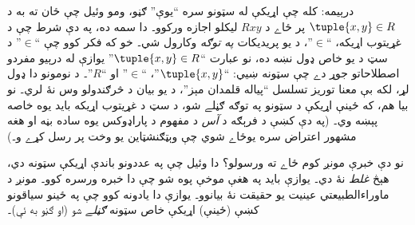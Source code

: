 \documentclass[../../../include/open-logic-section]{subfiles}
\begin{document}
درېيمه: کله چې اړيکې له سټونو سره ``يوې'' ګڼو، ومو وئيل چې ځان ته
به د $\tuple{x,y} \in R$ پر ځاے د $Rxy$ ليکلو اجازه ورکوو۔ دا سمه
ده، په دې شرط چې د غړيتوب اړيکه، ``$\in$''، د يو پريديکات
\emph{په توګه} وکارول شي۔ خو که فکر کوو چې ``$\in$'' د سټ د يو
خاص ډول نښه ده، نو عبارت ``$\tuple{x,y} \in R$'' يوازې له درېيو
مفردو اصطلاحاتو جوړ دے چې سټونه ښيي: ``$\tuple{x,y}$''، ``$\in$''
او ``$R$''۔ د نومونو دا ډول لړ، لکه بې معنا توريز تسلسل ``پياله
قلمدان مېز''، د يو بیان د څرګندولو وس نۀ لري۔ نو بيا هم، که ځينې
اړيکې د سټونو په توګه ګڼلے شو، د سټ د غړيتوب اړيکه بايد يوه خاصه
پېښه وي۔ (په دې کښې د فرېګه د \emph{آس} د مفهوم د پاراډوکس يوه
ساده بڼه او هغه مشهور اعتراض سره يوځاے شوي چې وېټګنشټاين يو وخت
پر رسل کړے و۔)

نو دې خبرې مونږ کوم ځاے ته ورسولو؟ دا وئيل چې په عددونو باندې
اړيکې سټونه دي، هېڅ \emph{غلط} نۀ دي۔ يوازې بايد په هغې موخې پوه
شو چې دا خبره ورسره کوو۔ مونږ د ماوراءالطبيعتي عينيت يو حقيقت نۀ
بيانوو۔ يوازې دا يادونه کوو چې په ځينو سياقونو کښې (ځينې) اړيکې
خاص سټونه \emph{ګڼلے} شو (او ګڼو به ئې)۔
\end{document}
